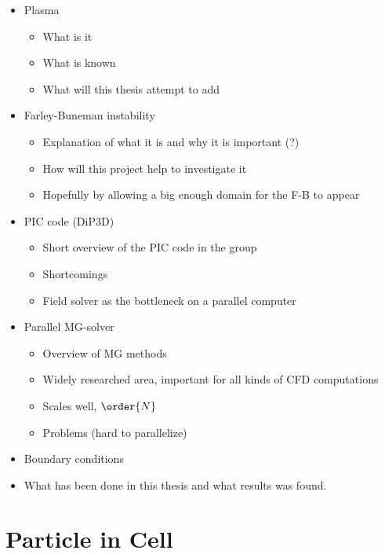 
	\begin{itemize}
		\item Plasma
			\begin{itemize}
				\item What is it
				\item What is known
				\item What will this thesis attempt to add
			\end{itemize}
		\item Farley-Buneman instability
			\begin{itemize}
				\item Explanation of what it is and why it is important (?)
				\item How will this project help to investigate it
				\item Hopefully by allowing a big enough domain for the F-B to appear
			\end{itemize}
		\item PIC code (DiP3D)
			\begin{itemize}
				\item Short overview of the PIC code in the group
				\item Shortcomings
				\item Field solver as the bottleneck on a parallel computer
			\end{itemize}
		\item Parallel MG-solver
			\begin{itemize}
				\item Overview of MG methods
				\item Widely researched area, important for all kinds of CFD computations
				\item Scales well, \(\order{N}\)
				\item Problems (hard to parallelize)
			\end{itemize}
		\item Boundary conditions
		\item What has been done in this thesis and what results was found.
	\end{itemize}


		\section{Particle in Cell}

